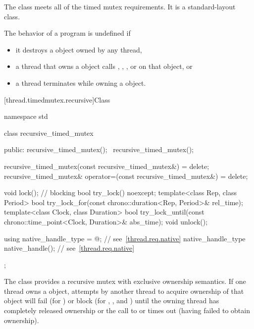 \pnum
The class  meets
all of the timed mutex requirements.
It is a standard-layout class.

\pnum
The behavior of a program is undefined if
\begin{itemize}
\item it destroys a  object owned by any thread,
\item a thread that owns a  object calls ,
, , or  on that object, or
\item a thread terminates while owning a  object.
\end{itemize}

[thread.timedmutex.recursive]{Class }

%
\begin{codeblock}
namespace std {
  class recursive_timed_mutex {
  public:
    recursive_timed_mutex();
    ~recursive_timed_mutex();

    recursive_timed_mutex(const recursive_timed_mutex&) = delete;
    recursive_timed_mutex& operator=(const recursive_timed_mutex&) = delete;

    void lock();    // blocking
    bool try_lock() noexcept;
    template<class Rep, class Period>
      bool try_lock_for(const chrono::duration<Rep, Period>& rel_time);
    template<class Clock, class Duration>
      bool try_lock_until(const chrono::time_point<Clock, Duration>& abs_time);
    void unlock();

    using native_handle_type = @\impdefnc@;          // see~\ref{thread.req.native}
    native_handle_type native_handle();                         // see~\ref{thread.req.native}
  };
}
\end{codeblock}

\pnum
{}%
The class  provides a recursive mutex with exclusive
ownership semantics. If one thread owns a  object,
attempts by another thread to acquire ownership of that object will fail (for
) or block (for , , and
) until the owning thread has completely released
ownership or the call to  or 
times out (having failed to obtain ownership).


